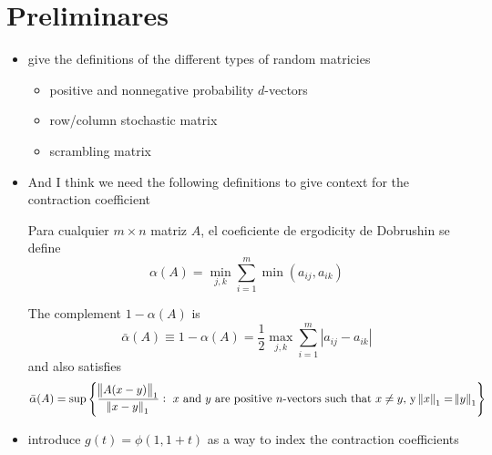 \section{Preliminares}
\begin{itemize}
    \item give the definitions of the different types of random matricies
    \begin{itemize}
        \item positive and nonnegative probability $d$-vectors
        \item row/column stochastic matrix
        \item scrambling matrix
    \end{itemize}
    \item And I think we need the following definitions to give context for the contraction coefficient
    \begin{definition*}
        
    \end{definition*}
    \begin{definition*}
        
    \end{definition*}
    \begin{definition*}[2.3]
        Para cualquier $m \times n$ matriz $A$, el coeficiente de ergodicity de Dobrushin se define
        \[\alpha(A) = \min_{j, k}\sum_{i = 1}^m \min(a_{ij},a_{ik})\]
    \end{definition*}
    The complement $1- \alpha(A)$ is 
    \[\bar{\alpha}(A) \equiv 1 - \alpha(A) = \frac{1}{2} \max_{j,k}\sum_{i = 1}^m|a_{ij} - a_{ik}|\]
    and also satisfies
    \[\bar{\alpha}(A) = \sup \left\{\frac{\norm{A(x-y)}_1}{\norm{x-y}_1}: \text{ $x$ and $y$ are positive $n$-vectors such that } x\neq y, \, \text{y} \, \norm{x}_1 = \norm{y}_1\right\}\]
    \item introduce $g(t) = \phi(1, 1+t)$ as a way to index the contraction coefficients
\end{itemize}



